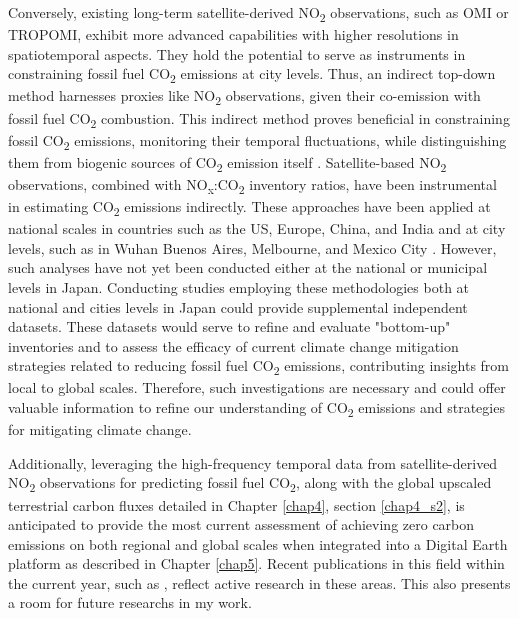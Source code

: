 Conversely, existing long-term satellite-derived NO\textsubscript{2} observations, such as OMI or TROPOMI, exhibit more advanced capabilities with higher resolutions in spatiotemporal aspects. They hold the potential to serve as instruments in constraining fossil fuel CO\textsubscript{2} emissions at city levels. Thus, an indirect top-down method harnesses proxies like NO\textsubscript{2} observations, given their co-emission with fossil fuel CO\textsubscript{2} combustion. This indirect method proves beneficial in constraining fossil CO\textsubscript{2} emissions, monitoring their temporal fluctuations, while distinguishing them from biogenic sources of CO\textsubscript{2} emission itself \citep{ciais2014current, goldberg2019exploiting}. Satellite-based NO\textsubscript{2} observations, combined with NO\textsubscript{x}:CO\textsubscript{2} inventory ratios, have been instrumental in estimating CO\textsubscript{2} emissions indirectly. These approaches have been applied at national scales in countries such as the US, Europe, China, and India \citep{konovalov2016estimation, zheng2020satellite, miyazaki2023predictability} and at city levels, such as in Wuhan \citep{zhang2023quantifying} Buenos Aires, Melbourne, and Mexico City \citep{yang2023using}. However, such analyses have not yet been conducted either at the national or municipal levels in Japan. Conducting studies employing these methodologies both at national and cities levels in Japan could provide supplemental independent datasets. These datasets would serve to refine and evaluate "bottom-up" inventories and to assess the efficacy of current climate change mitigation strategies related to reducing fossil fuel CO\textsubscript{2} emissions, contributing insights from local to global scales. Therefore, such investigations are necessary and could offer valuable information to refine our understanding of CO\textsubscript{2} emissions and strategies for mitigating climate change. \par

Additionally, leveraging the high-frequency temporal data from satellite-derived NO\textsubscript{2} observations for predicting fossil fuel CO\textsubscript{2}, along with the global upscaled terrestrial carbon fluxes detailed in Chapter \ref{chap4}, section \ref{chap4_s2}, is anticipated to provide the most current assessment of achieving zero carbon emissions on both regional and global scales when integrated into a Digital Earth platform as described in Chapter \ref{chap5}. Recent publications in this field within the current year, such as \citep{zhang2023quantifying, yang2023using, miyazaki2023predictability}, reflect active research in these areas. This also presents a room for future researchs in my work.\par